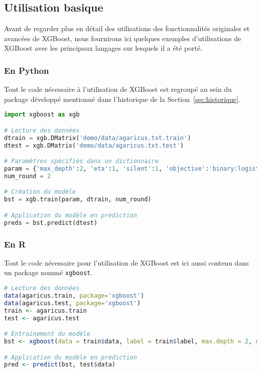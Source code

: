 \subsection{Utilisation basique}
Avant de regarder plus en détail des utilisations des fonctionnalités originales et avancées de XGBoost, nous fournirons ici quelques exemples d'utilisations de XGBoost avec les principaux langages sur lesquels il a été porté.

\subsubsection{En Python}
Tout le code nécessaire à l'utilisation de XGBoost est regroupé au sein du package développé mentionné dans l'historique de la Section~\ref{sec:historique}. 

\begin{lstlisting}[language=Python]
import xgboost as xgb

# Lecture des données
dtrain = xgb.DMatrix('demo/data/agaricus.txt.train')
dtest = xgb.DMatrix('demo/data/agaricus.txt.test')

# Paramètres spécifiés dans un dictionnaire
param = {'max_depth':2, 'eta':1, 'silent':1, 'objective':'binary:logistic'}
num_round = 2

# Création du modèle
bst = xgb.train(param, dtrain, num_round)

# Application du modèle en prédiction
preds = bst.predict(dtest)
\end{lstlisting}

\subsubsection{En R}
Tout le code nécessaire pour l'utilisation de XGBoost est ici aussi contenu dans un package nommé \texttt{xgboost}.

\begin{lstlisting}[language=R]
# Lecture des données
data(agaricus.train, package='xgboost')
data(agaricus.test, package='xgboost')
train <- agaricus.train
test <- agaricus.test

# Entrainement du modèle
bst <- xgboost(data = train$data, label = train$label, max.depth = 2, eta = 1, nround = 2, nthread = 2, objective = "binary:logistic")

# Application du modèle en prédiction
pred <- predict(bst, test$data)
\end{lstlisting}

